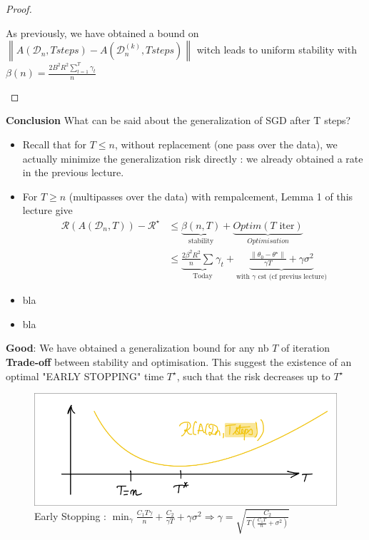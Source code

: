 \begin{proof}
\begin{itemize}
        As previously, we have obtained a bound on $\left\| A(\mathcal{D}_n, T steps) - A(\mathcal{D}_n^{(k)}, T steps) \right\| $ witch leads to uniform stability with $\beta (n) = \frac{2B^2R^2 \sum_{t=1}^{T}\gamma _t}{n}$
    \end{itemize}
\end{proof}
        
\textbf{Conclusion} What can be said about the generalization of SGD after T steps?
\begin{itemize}
    \item Recall that for $T \leq n$, without replacement (one pass over the data), we actually minimize the generalization risk directly : we already obtained a rate in the previous lecture. 
    \item For $ T \geq n $ (multipasses over the data) with rempalcement, Lemma 1 of this lecture give 
    \begin{align*}
        \mathcal{R}(A(\mathcal{D}_n, T)) - \mathcal{R}^\star 
        &\leq \underbrace{\beta (n,T)}_{\text{stability}} + \underbrace{Optim(T \text{ iter})}_{Optimisation} \\
        &\leq \underbrace{\frac{2 \beta ^2 R^2}{n }\sum_{}^{}\gamma _t}_{\text{Today}} + \underbrace{\frac{\left\| \theta _0 - \theta ^\star  \right\| }{\gamma T } + \gamma \sigma ^2}_{\text{with } \gamma \text{ cst (cf previus lecture)} }
    \end{align*}
\end{itemize}

\begin{itemize}
    \item [\textcolor{green}{\checkmark}] bla
    \item [\textcolor{red}{\texttimes}] bla
\end{itemize}
\textbf{Good}: We have obtained a generalization bound for any nb $ T $ of iteration \\
\textbf{Trade-off} between stability and optimisation. This suggest the existence of an optimal "EARLY STOPPING" time $ T^\star  $, such that the risk decreases up to $ T^\star  $     
\begin{figure}[!h]
    \centering
    \includegraphics[width=.75\textwidth]{figs/early_stoping.png}
    \caption{Early Stopping : $ \min _\gamma \frac{C_1 T \gamma }{n } + \frac{C_2}{\gamma T} + \gamma \sigma ^2 \Rightarrow \gamma = \sqrt{\frac{C_2}{T(\frac{C_1 T}{n} + \sigma ^2)}} $ }
\end{figure}
